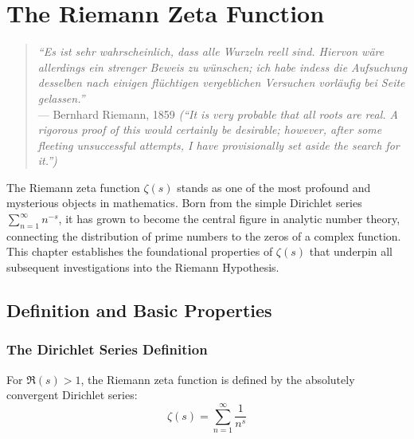 
\chapter{The Riemann Zeta Function}
\label{ch:riemann_zeta}

\begin{quote}
\textit{``Es ist sehr wahrscheinlich, dass alle Wurzeln reell sind. Hiervon wäre allerdings ein strenger Beweis zu wünschen; ich habe indess die Aufsuchung desselben nach einigen flüchtigen vergeblichen Versuchen vorläufig bei Seite gelassen.''} \\
--- Bernhard Riemann, 1859 \textit{(``It is very probable that all roots are real. A rigorous proof of this would certainly be desirable; however, after some fleeting unsuccessful attempts, I have provisionally set aside the search for it.'')}
\end{quote}

The Riemann zeta function $\zeta(s)$ stands as one of the most profound and mysterious objects in mathematics. Born from the simple Dirichlet series $\sum_{n=1}^{\infty} n^{-s}$, it has grown to become the central figure in analytic number theory, connecting the distribution of prime numbers to the zeros of a complex function. This chapter establishes the foundational properties of $\zeta(s)$ that underpin all subsequent investigations into the Riemann Hypothesis.

\section{Definition and Basic Properties}
\label{sec:definition_basic}

\subsection{The Dirichlet Series Definition}

\begin{definition}
\label{def:zeta_original}
For $\Re(s) > 1$, the Riemann zeta function is defined by the absolutely convergent Dirichlet series:
\begin{equation}
\zeta(s) = \sum_{n=1}^{\infty} \frac{1}{n^s}
\label{eq:zeta_dirichlet}
\end{equation}
\end{definition}

